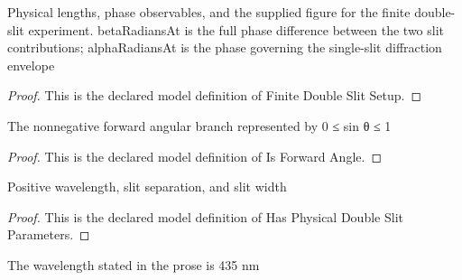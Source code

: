 \begin{definition}
  \label{def:physics:phyx-mini-0924:phyxminiproblems-problemphyxmini0924-finitedoubleslitsetup}
  Physical lengths, phase observables, and the supplied figure for the finite double-slit experiment. betaRadiansAt is the full phase difference between the two slit contributions; alphaRadiansAt is the phase governing the single-slit diffraction envelope
\end{definition}
\begin{proof}
  This is the declared model definition of Finite Double Slit Setup.
\end{proof}
\begin{definition}
  \label{def:physics:phyx-mini-0924:phyxminiproblems-problemphyxmini0924-isforwardangle}
  The nonnegative forward angular branch represented by 0 ≤ sin θ ≤ 1
\end{definition}
\begin{proof}
  This is the declared model definition of Is Forward Angle.
\end{proof}
\begin{definition}
  \label{def:physics:phyx-mini-0924:phyxminiproblems-problemphyxmini0924-hasphysicaldoubleslitparameters}
  Positive wavelength, slit separation, and slit width
\end{definition}
\begin{proof}
  This is the declared model definition of Has Physical Double Slit Parameters.
\end{proof}
\begin{definition}
  \label{def:physics:phyx-mini-0924:phyxminiproblems-problemphyxmini0924-matchesproblemwavelengthreadout}
  The wavelength stated in the prose is 435 nm
\end{definition}
